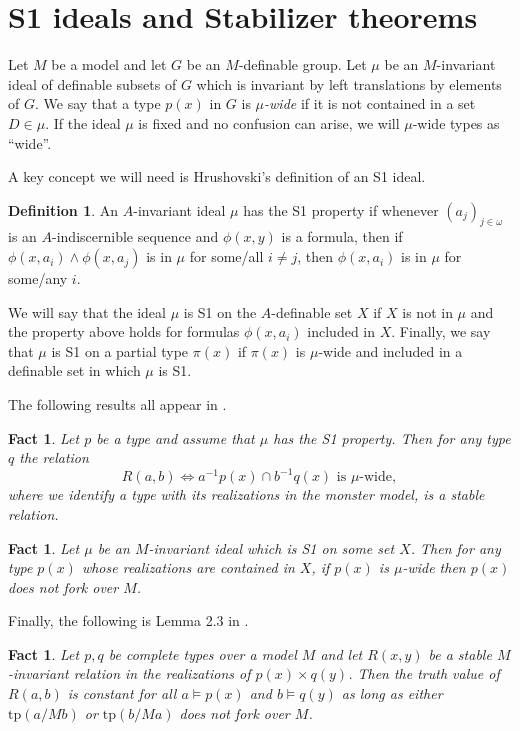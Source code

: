 \documentclass[12pt]{article}
\newtheorem{fait}[thm]{Fact}
\theoremstyle{definition}
\newtheorem{defi}[thm]{Definition}
\theoremstyle{mystyle}
\theoremstyle{remark}
\newcommand{\tp}{\mathrm{tp}}
\begin{document}
\section{S1 ideals and Stabilizer theorems}\label{SStabilizer}

Let $M$ be a model and let $G$ be an $M$-definable group. Let
$\mu$ be an $M$-invariant ideal of definable subsets of $G$ which
is invariant by left translations by elements of $G$. We say that
a type $p(x)$ in $G$ is \emph{$\mu$-wide} if it is not contained
in a set $D\in \mu$. If the ideal $\mu$ is fixed and no confusion
can arise, we will $\mu$-wide types as ``wide''.


A key concept we will need is Hrushovski's definition of an S1
ideal.


\begin{defi}
An $A$-invariant ideal $\mu$ has the S1 property if whenever $(
a_j)_{j \in \omega}$ is an $A$-indiscernible sequence and
$\phi(x,y)$ is a formula, then if $\phi(x,a_i)\wedge \phi(x,a_j)$
is in $\mu$ for some/all $i\neq j$, then $\phi(x,a_i)$ is in $\mu$
for some/any $i$.

We will say that the ideal $\mu$ is S1 on the $A$-definable set
$X$ if $X$ is not in $\mu$ and the property above holds for
formulas $\phi(x,a_i)$ included in $X$. Finally, we say that $\mu$
is S1 on a partial type $\pi(x)$ if $\pi(x)$ is $\mu$-wide and
included in a definable set in which $\mu$ is S1.
\end{defi}


The following results all appear in \cite{Hru12}.

\begin{fait}\label{HrStable}
Let $p$ be a type and assume that $\mu$ has the S1 property. Then for any type $q$ the relation
\[
R(a,b) \iff a^{-1}p(x) \cap b^{-1}q(x) \text{ is $\mu$-wide},
\]
where we identify a type with its realizations in the monster model, is a stable relation.
\end{fait}


\begin{fait}\label{wide}
Let $\mu$ be an $M$-invariant ideal which is S1 on some set $X$.
Then for any type $p(x)$ whose realizations are contained in $X$,
if $p(x)$ is $\mu$-wide then $p(x)$ does not fork over $M$.
\end{fait}


Finally, the following  is Lemma 2.3 in \cite{Hru12}.

\begin{fait}
Let $p,q$ be complete types over a model $M$ and let $R(x,y)$ be a stable $M$-invariant relation in the realizations of $p(x)\times q(y)$. Then the truth value of $R(a,b)$ is constant
for all $a\models p(x)$ and $b\models q(y)$ as long as either $\tp(a/Mb)$ or $\tp(b/Ma)$ does not fork over $M$.
\end{fait}
\end{document}
